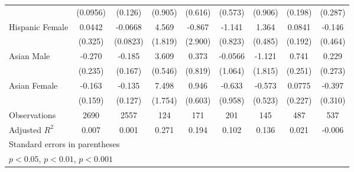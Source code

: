 \begin{landscape}
{\begin{longtable}{l*{8}{c}}
                    &    (0.0956)         &     (0.126)         &     (0.905)         &     (0.616)         &     (0.573)         &     (0.906)         &     (0.198)         &     (0.287)         \\
[1em]
Hispanic Female     &      0.0442         &     -0.0668         &       4.569\sym{*}  &      -0.867         &      -1.141         &       1.364\sym{**} &      0.0841         &      -0.146         \\
                    &     (0.325)         &    (0.0823)         &     (1.819)         &     (2.900)         &     (0.823)         &     (0.485)         &     (0.192)         &     (0.464)         \\
[1em]
Asian Male          &      -0.270         &      -0.185         &       3.609\sym{***}&       0.373         &     -0.0566         &      -1.121         &       0.741\sym{**} &       0.229         \\
                    &     (0.235)         &     (0.167)         &     (0.546)         &     (0.819)         &     (1.064)         &     (1.815)         &     (0.251)         &     (0.273)         \\
[1em]
Asian Female        &      -0.163         &      -0.135         &       7.498\sym{***}&       0.946         &      -0.633         &      -0.573         &      0.0775         &      -0.397         \\
                    &     (0.159)         &     (0.127)         &     (1.754)         &     (0.603)         &     (0.958)         &     (0.523)         &     (0.227)         &     (0.310)         \\
\hline
Observations        &        2690         &        2557         &         124         &         171         &         201         &         145         &         487         &         537         \\
Adjusted \(R^{2}\)  &       0.007         &       0.001         &       0.271         &       0.194         &       0.102         &       0.136         &       0.021         &      -0.006         \\
\hline\hline
\multicolumn{9}{l}{\footnotesize Standard errors in parentheses}\\
\multicolumn{9}{l}{\footnotesize \sym{*} \(p<0.05\), \sym{**} \(p<0.01\), \sym{***} \(p<0.001\)}\\

\end{longtable}}
\end{landscape}
